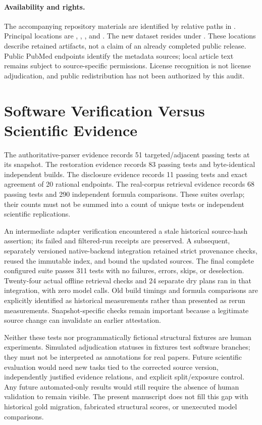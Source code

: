\documentclass{article}
\begin{document}
\paragraph{Availability and rights.}
The accompanying repository materials are identified by relative paths in . Principal locations are , , , and . The new dataset resides under . These locations describe retained artifacts, not a claim of an already completed public release. Public PubMed endpoints identify the metadata sources; local article text remains subject to source-specific permissions. License recognition is not license adjudication, and public redistribution has not been authorized by this audit.

\section{Software Verification Versus Scientific Evidence}
The authoritative-parser evidence records 51 targeted/adjacent passing tests at its snapshot. The restoration evidence records 83 passing tests and byte-identical independent builds. The disclosure evidence records 11 passing tests and exact agreement of 20 rational endpoints. The real-corpus retrieval evidence records 68 passing tests and 290 independent formula comparisons. These suites overlap; their counts must not be summed into a count of unique tests or independent scientific replications.

An intermediate adapter verification encountered a stale historical source-hash assertion; its failed and filtered-run receipts are preserved. A subsequent, separately versioned native-backend integration retained strict provenance checks, reused the immutable index, and bound the updated sources. The final complete configured suite passes 311 tests with no failures, errors, skips, or deselection. Twenty-four actual offline retrieval checks and 24 separate dry plans ran in that integration, with zero model calls. Old build timings and formula comparisons are explicitly identified as historical measurements rather than presented as rerun measurements. Snapshot-specific checks remain important because a legitimate source change can invalidate an earlier attestation.

Neither these tests nor programmatically fictional structural fixtures are human experiments. Simulated adjudication statuses in fixtures test software branches; they must not be interpreted as annotations for real papers. Future scientific evaluation would need new tasks tied to the corrected source version, independently justified evidence relations, and explicit split/exposure control. Any future automated-only results would still require the absence of human validation to remain visible. The present manuscript does not fill this gap with historical gold migration, fabricated structural scores, or unexecuted model comparisons.
\end{document}

